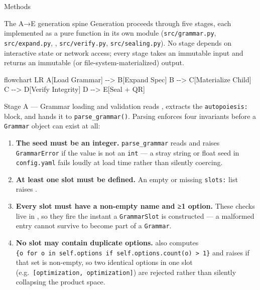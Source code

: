 \documentclass[
  ignorenonframetext,
]{beamer}
\author{\texorpdfstring{}{}}
\date{}
\newenvironment{Shaded}{}{}
\newcommand{\NormalTok}[1]{#1}
\providecommand{\tightlist}{%
  \setlength{\itemsep}{0pt}\setlength{\parskip}{0pt}}
\begin{document}
\begin{frame}{Methods}
\protect{}\label{methods}
\begin{block}{The A→E generation spine}
\protect{}\label{the-ae-generation-spine}
Generation proceeds through five stages, each implemented as a pure
function in its own module (\texttt{src/grammar.py},
\texttt{src/expand.py}, ,
\texttt{src/verify.py}, \texttt{src/sealing.py}). No stage depends on
interactive state or network access; every stage takes an immutable
input and returns an immutable (or file-system-materialized) output.

\begin{Shaded}
\begin{Highlighting}[]
\NormalTok{flowchart LR}
\NormalTok{    A[Load Grammar] {-}{-}\textgreater{} B[Expand Spec]}
\NormalTok{    B {-}{-}\textgreater{} C[Materialize Child]}
\NormalTok{    C {-}{-}\textgreater{} D[Verify Integrity]}
\NormalTok{    D {-}{-}\textgreater{} E[Seal + QR]}
\end{Highlighting}
\end{Shaded}
\end{block}

\begin{block}{Stage A --- Grammar loading and validation}
\protect{}\label{stage-a-grammar-loading-and-validation}
 reads
, extracts the \texttt{autopoiesis:}
block, and hands it to \texttt{parse\_grammar()}. Parsing enforces four
invariants before a \texttt{Grammar} object can exist at all:

\begin{enumerate}
\tightlist
\item
  \textbf{The seed must be an integer.} \texttt{parse\_grammar} reads
   and raises \texttt{GrammarError} if
  the value is not an \texttt{int} --- a stray string or float seed in
  \texttt{config.yaml} fails loudly at load time rather than silently
  coercing.
\item
  \textbf{At least one slot must be defined.} An empty or missing
  \texttt{slots:} list raises
  .
\item
  \textbf{Every slot must have a non-empty name and ≥1 option.} These
  checks live in , so they fire
  the instant a \texttt{GrammarSlot} is constructed --- a malformed
  entry cannot survive to become part of a \texttt{Grammar}.
\item
  \textbf{No slot may contain duplicate options.}
   also computes
  \texttt{\{o\ for\ o\ in\ self.options\ if\ self.options.count(o)\ \textgreater{}\ 1\}}
  and raises if that set is non-empty, so two identical options in one
  slot (e.g.~\texttt{{[}optimization,\ optimization{]}}) are rejected
  rather than silently collapsing the product space.
\end{enumerate}


\end{block}
\end{frame}
\end{document}
